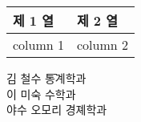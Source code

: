 \documentclass[11pt]{article}
\begin{document}
{
\tabcolsep=0in
\begin{tabular}{l|l}
제 1 열 & 제 2 열 \\ \hline
column 1 & column 2
\end{tabular}}

\begin{tabbing}
김 철수 \= 통계학과 \\
이 미숙 \> 수학과 \\
야수 오모리 \> 경졔학과
\end{tabbing}

\end{document}
